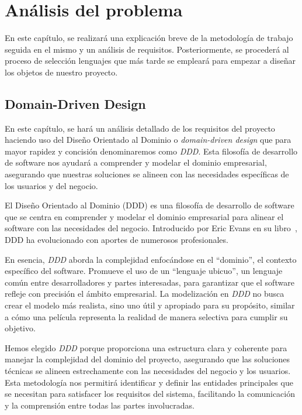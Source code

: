 \chapter{Análisis del problema}

En este capítulo, se realizará una explicación breve de la metodología de trabajo seguida en el mismo y un análisis de requisitos. Posteriormente, se procederá al proceso de selección lenguajes que más tarde se empleará para empezar a diseñar los objetos de nuestro proyecto.

\section{Domain-Driven Design}

En este capítulo, se hará un análisis detallado de los requisitos del proyecto haciendo uso del Diseño Orientado al Dominio o \textit{domain-driven design} que para mayor rapidez y concisión denominaremos como \textit{DDD}. Esta filosofía de desarrollo de software nos ayudará a comprender y modelar el dominio empresarial, asegurando que nuestras soluciones se alineen con las necesidades específicas de los usuarios y del negocio.

El Diseño Orientado al Dominio (DDD) es una filosofía de desarrollo de software que se centra en comprender y modelar el dominio empresarial para alinear el software con las necesidades del negocio. Introducido por Eric Evans en su libro~\cite{evans2004domain}, DDD ha evolucionado con aportes de numerosos profesionales.

En esencia, \textit{DDD} aborda la complejidad enfocándose en el ``dominio'', el contexto específico del software. Promueve el uso de un ``lenguaje ubicuo'', un lenguaje común entre desarrolladores y partes interesadas, para garantizar que el software refleje con precisión el ámbito empresarial. La modelización en \textit{DDD} no busca crear el modelo más realista, sino uno útil y apropiado para su propósito, similar a cómo una película representa la realidad de manera selectiva para cumplir su objetivo.

Hemos elegido \textit{DDD} porque proporciona una estructura clara y coherente para manejar la complejidad del dominio del proyecto, asegurando que las soluciones técnicas se alineen estrechamente con las necesidades del negocio y los usuarios. Esta metodología nos permitirá identificar y definir las entidades principales que se necesitan para satisfacer los requisitos del sistema, facilitando la comunicación y la comprensión entre todas las partes involucradas.

